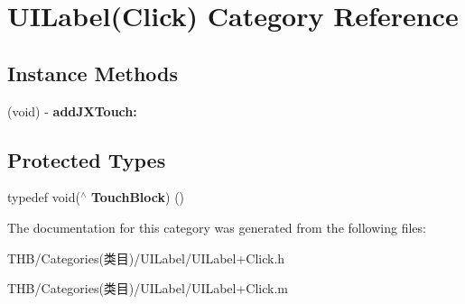 \hypertarget{category_u_i_label_07_click_08}{}\section{U\+I\+Label(Click) Category Reference}
\label{category_u_i_label_07_click_08}
\subsection*{Instance Methods}
\begin{DoxyCompactItemize}
\item 
\mbox{\label{category_u_i_label_07_click_08_a3f6f97bc13c728d02a9217d96aa537ce}} 
(void) -\/ {\bfseries add\+J\+X\+Touch\+:}
\end{DoxyCompactItemize}
\subsection*{Protected Types}
\begin{DoxyCompactItemize}
\item 
\mbox{\label{category_u_i_label_07_click_08_a2819b02b771cb7b06d11e0e7ea7a7131}} 
typedef void($^\wedge$ {\bfseries Touch\+Block}) ()
\end{DoxyCompactItemize}


The documentation for this category was generated from the following files\+:\begin{DoxyCompactItemize}
\item 
T\+H\+B/\+Categories(类目)/\+U\+I\+Label/U\+I\+Label+\+Click.\+h\item 
T\+H\+B/\+Categories(类目)/\+U\+I\+Label/U\+I\+Label+\+Click.\+m\end{DoxyCompactItemize}
